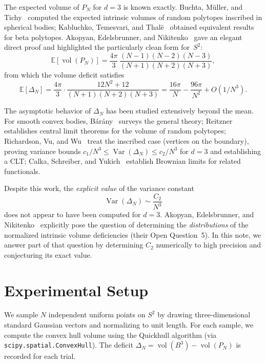 \documentclass[11pt]{article}
\begin{document}
The expected volume of $P_N$ for $d = 3$ is known exactly.
Buchta, M\"uller, and Tichy~\cite{BMT1985} computed the expected
intrinsic volumes of random polytopes inscribed in spherical
bodies; Kabluchko, Temesvari, and Thal\"e~\cite{KTT2019} obtained
equivalent results for beta polytopes.  Akopyan, Edelsbrunner,
and Nikitenko~\cite{AEN2021} gave an elegant direct proof and
highlighted the particularly clean form for~$S^2$:
\begin{equation}\label{eq:exact-mean}
  \mathbb{E}[\operatorname{vol}(P_N)]
  = \frac{4\pi}{3}\,
    \frac{(N-1)(N-2)(N-3)}{(N+1)(N+2)(N+3)},
\end{equation}
from which the volume deficit satisfies
\begin{equation}\label{eq:deficit-exact}
  \mathbb{E}[\Delta_N]
  = \frac{4\pi}{3}\cdot
    \frac{12N^2 + 12}{(N+1)(N+2)(N+3)}
  = \frac{16\pi}{N} - \frac{96\pi}{N^2} + O(1/N^3).
\end{equation}

The asymptotic behavior of $\Delta_N$ has been studied extensively
beyond the mean.  For smooth convex bodies, B\'ar\'any~\cite{Barany2008}
surveys the general theory; Reitzner~\cite{Reitzner2005} establishes
central limit theorems for the volume of random polytopes;
Richardson, Vu, and Wu~\cite{RVW2007,RVW2008} treat the inscribed
case (vertices on the boundary), proving variance bounds
$c_1/N^3 \le \operatorname{Var}(\Delta_N) \le c_2/N^3$ for $d = 3$
and establishing a CLT; Calka, Schreiber, and Yukich~\cite{CSY2013}
establish Brownian limits for related functionals.

Despite this work, the \emph{explicit value} of the variance constant
\[
  \operatorname{Var}(\Delta_N) \sim \frac{C_2}{N^3}
\]
does not appear to have been computed for $d = 3$.  Akopyan,
Edelsbrunner, and Nikitenko~\cite{AEN2021} explicitly pose the
question of determining the \emph{distributions} of the normalized
intrinsic volume deficiencies (their Open Question~5).  In this
note, we answer part of that question by determining $C_2$
numerically to high precision and conjecturing its exact value.

\section{Experimental Setup}

We sample $N$ independent uniform points on $S^2$ by drawing
three-dimensional standard Gaussian vectors and normalizing to unit
length.  For each sample, we compute the convex hull volume using the
Quickhull algorithm (via \texttt{scipy.spatial.ConvexHull}).  The
deficit $\Delta_N = \operatorname{vol}(B^3) -
\operatorname{vol}(P_N)$ is recorded for each trial.
\end{document}
